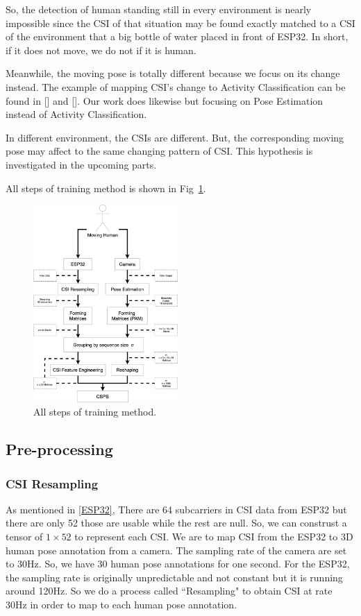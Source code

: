 \documentclass[10pt,letterpaper]{article}
\begin{document}
So, the detection of human standing still in every environment is nearly impossible since the CSI of that situation may be found exactly matched to a CSI of the environment that a big bottle of water placed in front of ESP32.
In short, if it does not move, we do not if it is human.

Meanwhile, the moving pose is totally different because we focus on its change instead. The example of mapping CSI's change to Activity Classification can be found in [] and []. Our work does likewise but focusing on Pose Estimation instead of Activity Classification.

In different environment, the CSIs are  different. But, the corresponding moving pose may affect to the same changing pattern of CSI. This hypothesis is investigated in the upcoming parts.






All steps of training method is shown in Fig~\ref{fig:TRAINSTEP}. 


\begin{figure}[htbp]
	\centerline{\includegraphics[width=55mm,scale=0.2]{TRAINSTEP06.png}}
	\caption{All steps of training method.}
	\label{fig:TRAINSTEP}
\end{figure}



\subsection*{Pre-processing}\label{Processing}

\subsubsection*{CSI Resampling}


As mentioned in \ref{ESP32}, There are 64 subcarriers in CSI data from ESP32 but there are only 52 those are usable while the rest are null. So, we can construst a tensor of $1 \times 52$ to represent each CSI. We are to map CSI from the ESP32 to 3D human pose annotation from a camera. The sampling rate of the camera are set to 30Hz. So, we have 30 human pose annotations for one second. For the ESP32, the sampling rate is originally unpredictable and not constant but it is running around 120Hz. So we do a process called ``Resampling" to obtain CSI at rate 30Hz in order to map to each human pose annotation.
\end{document}
